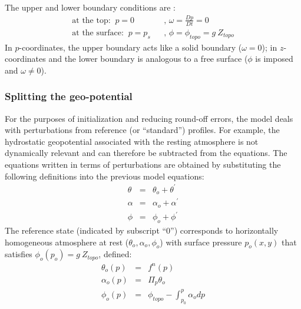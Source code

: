 The upper and lower boundary conditions are : 
\begin{eqnarray}
\mbox{at the top:}\;\;p=0 &&\text{, }\omega =\frac{Dp}{Dt}=0 \\
\mbox{at the surface:}\;\;p=p_{s} &&\text{, }\phi =\phi _{topo}=g~Z_{topo}
\label{eq:boundary-condition-atmosphere}
\end{eqnarray}
In $p$-coordinates, the upper boundary acts like a solid boundary ($\omega
=0 $); in $z$-coordinates and the lower boundary is analogous to a free
surface ($\phi $ is imposed and $\omega \neq 0$).

\subsubsection{Splitting the geo-potential}

For the purposes of initialization and reducing round-off errors, the model
deals with perturbations from reference (or ``standard'') profiles. For
example, the hydrostatic geopotential associated with the resting atmosphere
is not dynamically relevant and can therefore be subtracted from the
equations. The equations written in terms of perturbations are obtained by
substituting the following definitions into the previous model equations: 
\begin{eqnarray}
\theta &=&\theta _{o}+\theta ^{\prime }  \label{eq:atmos-ref-prof-theta} \\
\alpha &=&\alpha _{o}+\alpha ^{\prime }  \label{eq:atmos-ref-prof-alpha} \\
\phi &=&\phi _{o}+\phi ^{\prime }  \label{eq:atmos-ref-prof-phi}
\end{eqnarray}
The reference state (indicated by subscript ``0'') corresponds to
horizontally homogeneous atmosphere at rest ($\theta _{o},\alpha _{o},\phi
_{o}$) with surface pressure $p_{o}(x,y)$ that satisfies $\phi
_{o}(p_{o})=g~Z_{topo}$, defined: 
\begin{eqnarray*}
\theta _{o}(p) &=&f^{n}(p) \\
\alpha _{o}(p) &=&\Pi _{p}\theta _{o} \\
\phi _{o}(p) &=&\phi _{topo}-\int_{p_{0}}^{p}\alpha _{o}dp
\end{eqnarray*}

